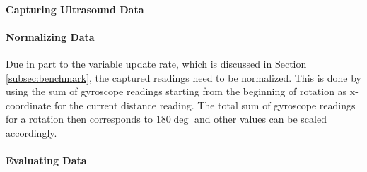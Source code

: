 \paragraph{Capturing Ultrasound Data}

\paragraph{Normalizing Data}
Due in part to the variable update rate, which is discussed in Section \ref{subsec:benchmark}, the captured readings need to be normalized.
This is done by using the sum of gyroscope readings starting from the beginning of rotation as x-coordinate for the current distance reading.
The total sum of gyroscope readings for a rotation then corresponds to $180\deg$ and other values can be scaled accordingly.

\paragraph{Evaluating Data}